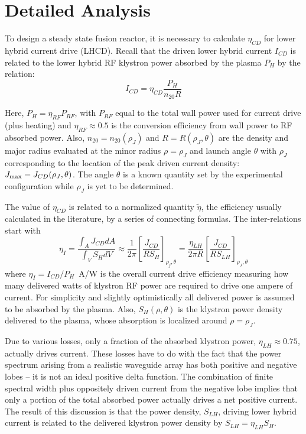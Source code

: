 \section{Detailed Analysis}

To design a steady state fusion reactor, it is necessary to calculate $\eta_{CD}$ for lower hybrid current drive (LHCD). Recall that the driven lower hybrid current $I_{CD}$ is related to the lower hybrid RF klystron power absorbed by the plasma $P_H$ by the relation:
\begin{equation}
\label{eq:lhcd_1}
I _ { C D } = \eta _ { C D } \frac { P _ { H } } { n _ { 20 } R }
\end{equation}

Here, $P_H = \eta_{RF} P_{RF}$, with $P_{RF}$ equal to the total wall power used for current drive (plus heating) and $\eta_{RF} \approx 0.5$ is the conversion efficiency from wall power to RF absorbed power. Also, $n_{20} = n_{20}(\rho_J)$ and $R = R(\rho_J, \theta)$ are the density and major radius evaluated at the minor radius $\rho = \rho_J$ and launch angle $\theta$ with $\rho_J$ corresponding to the location of the peak driven current density: $J_{\textnormal{max}} = J_{CD}(\rho_J, \theta)$. The angle $\theta$ is a known quantity set by the experimental configuration while $\rho_J$ is yet to be determined.

The value of $\eta_{CD}$ is related to a normalized quantity $\tilde \eta$, the efficiency usually calculated in the literature, by a series of connecting formulas. The inter-relations start with
\begin{equation}
 \eta_I = \frac { \int _ { A } J _ { C D } d A } { \int _ { V } S _ { H } d V } \approx \frac { 1 } { 2 \pi } \left[ \frac { J _ { C D } } { R S _ { H } } \right] _ { \rho _ { j } , \theta } = \frac { \eta _ { L H } } { 2 \pi R } \left[ \frac { J _ { C D } } { R S _ { L H } } \right] _ { \rho _ { J } , \theta }
\end{equation}
where $\eta_I = I_{CD} / P_H$\, A/W is the overall current drive efficiency measuring how many delivered watts of klystron RF power are required to drive one ampere of current. For simplicity and slightly optimistically all delivered power is assumed to be absorbed by the plasma. Also, $S_H(\rho,\theta)$ is the klystron power density delivered to the plasma, whose absorption is localized around $\rho = \rho_J$.

Due to various losses, only a fraction of the absorbed klystron power, $\eta_{LH} \approx 0.75$, actually drives current. These losses have to do with the fact that the power spectrum arising from a realistic waveguide array has both positive and negative lobes -- it is not an ideal positive delta function. The combination of finite spectral width plus oppositely driven current from the negative lobe implies that only a portion of the total absorbed power actually drives a net positive current. The result of this discussion is that the power density, $S_{LH}$, driving lower hybrid current is related to the delivered klystron power density by $S_{LH} = \eta_{LH} S_H$.

